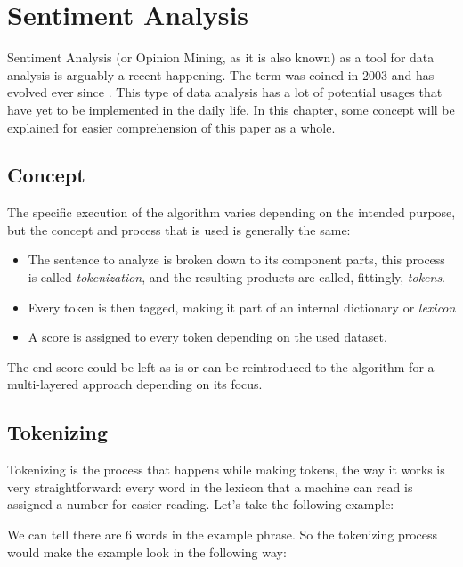 \chapter{Sentiment Analysis}
Sentiment Analysis (or Opinion Mining, as it is also known) as a tool for data analysis is arguably a recent happening. The term was coined in 2003 and has evolved ever since \citep{rf3}.
This type of data analysis has a lot of potential usages that have yet to be implemented in the daily life.
In this chapter, some concept will be explained for easier comprehension of this paper as a whole.

\section{Concept}
The specific execution of the algorithm varies depending on the intended purpose, but the concept and process that is used is generally the same:
\begin{itemize}
	\item The sentence to analyze is broken down to its component parts, this process is called \textit{tokenization}, and the resulting products are called, fittingly, \textit{tokens}.
	\item Every token is then tagged, making it part of an internal dictionary or \textit{lexicon}
	\item A score is assigned to every token depending on the used dataset.
\end{itemize}
The end score could be left as-is or can be reintroduced to the algorithm for a multi-layered approach depending on its focus. \citep{rf4}

\section{Tokenizing}
Tokenizing is the process that happens while making tokens, the way it works is very straightforward: every word in the lexicon that a machine can read is assigned a number for easier reading. Let's take the following example:
\begin{center}
\end{center}

We can tell there are 6 words in the example phrase. So the tokenizing process would make the example look in the following way:
\begin{center}
\end{center}

